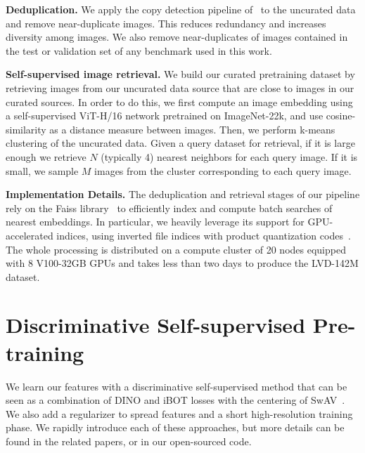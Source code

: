 \textbf{Deduplication.}
We apply the copy detection pipeline of~\cite{pizzi2022self} to the uncurated data and remove near-duplicate images. This reduces redundancy and increases diversity among images. We also remove near-duplicates of images contained in the test or validation set of any benchmark used in this work.  

\textbf{Self-supervised image retrieval.} We build our curated pretraining dataset by retrieving images from our uncurated data source that are close to images in our curated sources. In order to do this, we first compute an image embedding using a self-supervised ViT-H/16 network pretrained on ImageNet-22k, and use cosine-similarity as a distance measure between images. Then, we perform k-means clustering of the uncurated data. Given a query dataset for retrieval, if it is large enough we retrieve $N$ (typically 4) nearest neighbors for each query image. If it is small, we sample $M$ images from the cluster corresponding to each query image. 

\textbf{Implementation Details.} The deduplication and retrieval stages of our pipeline rely on the Faiss library~\citep{johnson2019billion} to efficiently index and compute batch searches of nearest embeddings. In particular, we heavily leverage its support for GPU-accelerated indices, using inverted file indices with product quantization codes~\citep{jegou2010product}. The whole processing is distributed on a compute cluster of 20 nodes equipped with 8 V100-32GB GPUs and takes less than two days to produce the LVD-142M dataset.

\section{Discriminative Self-supervised Pre-training}
\label{sec:approach}
We learn our features with a discriminative self-supervised method that can be seen as a combination of DINO and iBOT losses with the centering of SwAV~\citep{caron2020unsupervised}. We also add a regularizer to spread features and a short high-resolution training phase. We rapidly introduce each of these approaches, but more details can be found in the related papers, or in our open-sourced code.

